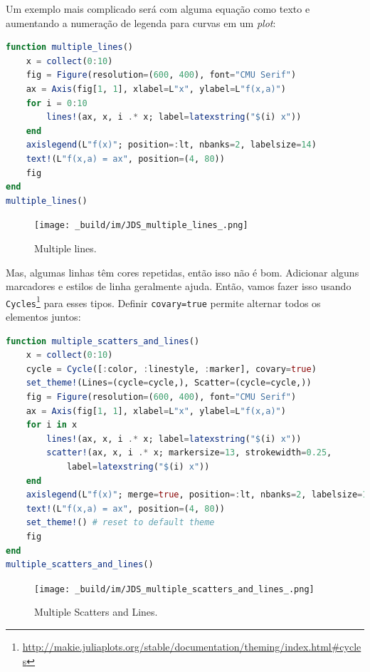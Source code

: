 \documentclass[
  notoc %
]{tufte-book}
\DeclareRobustCommand{\href}[2]{#2\footnote{\url{#1}}}
\newcommand{\passthrough}[1]{#1}
\begin{document}
Um exemplo mais complicado será com alguma equação como texto e
aumentando a numeração de legenda para curvas em um \emph{plot}:

\begin{lstlisting}[language=Julia]
function multiple_lines()
    x = collect(0:10)
    fig = Figure(resolution=(600, 400), font="CMU Serif")
    ax = Axis(fig[1, 1], xlabel=L"x", ylabel=L"f(x,a)")
    for i = 0:10
        lines!(ax, x, i .* x; label=latexstring("$(i) x"))
    end
    axislegend(L"f(x)"; position=:lt, nbanks=2, labelsize=14)
    text!(L"f(x,a) = ax", position=(4, 80))
    fig
end
multiple_lines()
\end{lstlisting}

\begin{figure}
\hypertarget{fig:multiple_lines}{%
\centering
\texttt{[image: \_build/im/JDS\_multiple\_lines\_.png]}
\caption{Multiple lines.}\label{fig:multiple_lines}
}
\end{figure}

Mas, algumas linhas têm cores repetidas, então isso não é bom. Adicionar
alguns marcadores e estilos de linha geralmente ajuda. Então, vamos
fazer isso usando
\href{http://makie.juliaplots.org/stable/documentation/theming/index.html\#cycles}{\passthrough{\lstinline!Cycles!}}
para esses tipos. Definir \passthrough{\lstinline!covary=true!} permite
alternar todos os elementos juntos:

\begin{lstlisting}[language=Julia]
function multiple_scatters_and_lines()
    x = collect(0:10)
    cycle = Cycle([:color, :linestyle, :marker], covary=true)
    set_theme!(Lines=(cycle=cycle,), Scatter=(cycle=cycle,))
    fig = Figure(resolution=(600, 400), font="CMU Serif")
    ax = Axis(fig[1, 1], xlabel=L"x", ylabel=L"f(x,a)")
    for i in x
        lines!(ax, x, i .* x; label=latexstring("$(i) x"))
        scatter!(ax, x, i .* x; markersize=13, strokewidth=0.25,
            label=latexstring("$(i) x"))
    end
    axislegend(L"f(x)"; merge=true, position=:lt, nbanks=2, labelsize=14)
    text!(L"f(x,a) = ax", position=(4, 80))
    set_theme!() # reset to default theme
    fig
end
multiple_scatters_and_lines()
\end{lstlisting}

\begin{figure}
\hypertarget{fig:multiple_scatters_and_lines}{%
\centering
\texttt{[image: \_build/im/JDS\_multiple\_scatters\_and\_lines\_.png]}
\caption{Multiple Scatters and
Lines.}\label{fig:multiple_scatters_and_lines}
}
\end{figure}
\end{document}
